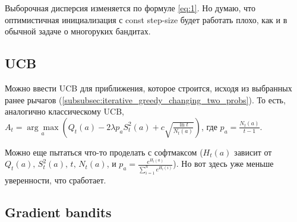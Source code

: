 Выборочная дисперсия изменяется по формуле \ref{eq:1}. Но думаю, что оптимистичная инициализация с const step-size будет работать плохо, как и в обычной задаче о многоруких бандитах.

\subsection{UCB}
Можно ввести UCB для приближения, которое строится, исходя из выбранных ранее рычагов (\ref{subsubsec:iterative_greedy_changing_two_probs}). То есть, аналогично классическому UCB, $A_t = \underset{a}{\arg \max} \left( Q_t(a) - 2 \lambda p_a S_t^2(a) + c \sqrt{\frac{\ln t}{N_t(a)}} \right)$, где $p_a = \frac{N_t(a)}{t-1}$.

Можно еще пытаться что-то проделать с софтмаксом ($H_t(a)$ зависит от $Q_t(a), \, S_t^2(a), \, t, \, N_t(a)$, и $p_a = \frac{e^{H_t(a)}}{\sum_{i=1}^n e^{H_t(i)}}$). Но вот здесь уже меньше уверенности, что сработает.

\subsection{Gradient bandits}


